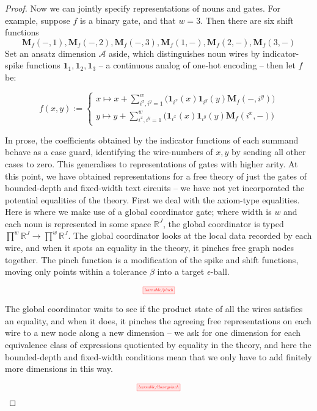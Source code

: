 \begin{theorem}
\begin{proof}
Now we can jointly specify representations of nouns and gates. For example, suppose $f$ is a binary gate, and that $w=3$. Then there are six shift functions $$\mathbf{M}_f(-,1),\mathbf{M}_f(-,2),\mathbf{M}_f(-,3),\mathbf{M}_f(1,-),\mathbf{M}_f(2,-),\mathbf{M}_f(3,-)$$ Set an ansatz dimension $\mathcal{A}$ aside, which distinguishes noun wires by indicator-spike functions $\mathbf{1}_{1},\mathbf{1}_{2},\mathbf{1}_{3}$ -- a continuous analog of one-hot encoding -- then let $f$ be:

\[f(x,y) := \begin{cases}
x \mapsto x + \sum\limits^{w}_{i^x,i^y =1}\big(\mathbf{1}_{i^x}(x)\mathbf{1}_{i^y}(y) \mathbf{M}_f(-,i^y)  \big) \\
y \mapsto y + \sum\limits^{w}_{i^x,i^y =1}\big(\mathbf{1}_{i^x}(x)\mathbf{1}_{i^y}(y) \mathbf{M}_f(i^x,-)  \big)
\end{cases}
\]

In prose, the coefficients obtained by the indicator functions of each summand behave as a case guard, identifying the wire-numbers of $x,y$ by sending all other cases to zero. This generalises to representations of gates with higher arity. At this point, we have obtained representations for a free theory of just the gates of bounded-depth and fixed-width text circuits -- we have not yet incorporated the potential equalities of the theory. First we deal with the axiom-type equalities. Here is where we make use of a global coordinator gate; where width is $w$ and each noun is represented in some space $\mathbb{R}^J$, the global coordinator is typed $\prod\limits^w \mathbb{R}^J \rightarrow \prod\limits^w \mathbb{R}^J$. The global coordinator looks at the local data recorded by each wire, and when it spots an equality in the theory, it pinches free graph nodes together. The pinch function is a modification of the spike and shift functions, moving only points within a tolerance $\beta$ into a target $\epsilon$-ball.

\[\scalebox{0.5}{\tikzfig{learnable/pinch}}\]

The global coordinator waits to see if the product state of all the wires satisfies an equality, and when it does, it pinches the agreeing free representations on each wire to a new node along a new dimension -- we ask for one dimension for each equivalence class of expressions quotiented by equality in the theory, and here the bounded-depth and fixed-width conditions mean that we only have to add finitely more dimensions in this way.

\[\scalebox{0.5}{\tikzfig{learnable/theorypinch}}\]


\end{proof}
\end{theorem}
